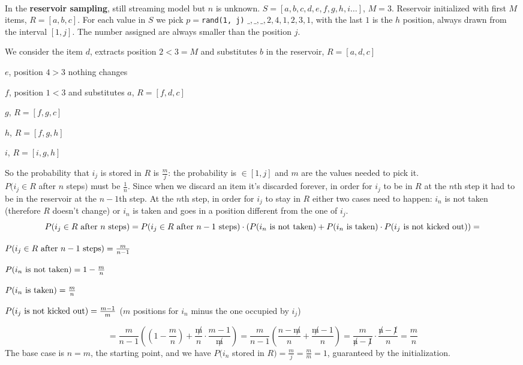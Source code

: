 \documentclass[10pt]{report}
\begin{document}
\paragraph{} In the \textbf{reservoir sampling}, still streaming model but $n$ is unknown. $S = [a, b, c, d, e, f, g, h, i\ldots]$, $M = 3$. Reservoir initialized with first $M$ items, $R = [a, b, c]$. For each value in $S$ we pick $p=$\texttt{rand(1, j)} $\_, \_, \_, 2, 4, 1, 2, 3, 1$, with the last $1$ is the $h$ position, always drawn from the interval $[1, j]$. The number assigned are always smaller than the position $j$.
\begin{list}{}{}
	\item We consider the item $d$, extracts position $2 < 3 = M$ and substitutes $b$ in the reservoir, $R = [a, d, c]$
	\item $e$, position $4 > 3$ nothing changes
	\item $f$, position $1 < 3$ and substitutes $a$, $R =  [f, d, c]$
	\item $g$, $R = [f, g, c]$
	\item $h$, $R = [f, g, h]$
	\item $i$, $R = [i, g, h]$
\end{list}
So the probability that $i_j$ is stored in $R$ is $\frac{m}{j}$: the probability is $\in [1,j]$ and $m$ are the values needed to pick it.\\
$P(i_j\in R$ after $n$ steps$)$ must be $\frac{1}{n}$. Since when we discard an item it's discarded forever, in order for $i_j$ to be in $R$ at the $n$th step it had to be in the reservoir at the $n-1$th step. At the $n$th step, in order for $i_j$ to stay in $R$ either two cases need to happen: $i_n$ is not taken (therefore $R$ doesn't change) or $i_n$ is taken and goes in a position different from the one of $i_j$.\\
$$P(i_j\in R\hbox{ after }n\hbox{ steps})= P(i_j\in R\hbox{ after }n-1\hbox{ steps})\cdot( P(i_n\hbox{ is not taken})+ P(i_n\hbox{ is taken})\cdot P(i_j\hbox{ is not kicked out}))=$$
\begin{list}{}{}
	\item $P(i_j\in R\hbox{ after }n-1\hbox{ steps}) = \frac{m}{n-1}$
	\item $P(i_n\hbox{ is not taken}) = 1-\frac{m}{n}$
	\item $P(i_n\hbox{ is taken}) = \frac{m}{n}$
	\item $P(i_j\hbox{ is not kicked out}) = \frac{m-1}{m}$ ($m$ positions for $i_n$ minus the one occupied by $i_j$)
\end{list}
$$=\frac{m}{n-1} \left( \left( 1-\frac{m}{n}\right) + \frac{\not m}{n}\cdot\frac{m-1}{\not m}\right) = \frac{m}{n-1}\left(\frac{n - \not m}{n} + \frac{\not m - 1}{n}\right) =\frac{m}{\not n-\not 1}\cdot\frac{\not n - \not 1}{n}= \frac{m}{n}$$
The base case is $n=m$, the starting point, and we have $P(i_n$ stored in $R) = \frac{m}{j} = \frac{m}{m} = 1$, guaranteed by the initialization.
\end{document}
